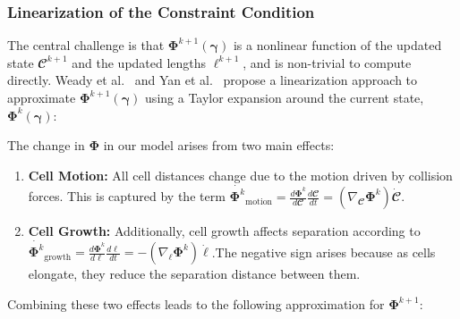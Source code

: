 \documentclass[a4paper,fleqn]{cas-dc}
\begin{document}
\subsubsection{Linearization of the Constraint Condition}

The central challenge is that $\mathbf{\Phi}^{k+1}(\boldsymbol{\gamma})$ is a nonlinear function of the updated state $\mathbfcal{C}^{k+1}$ and the updated lengths $\boldsymbol{\ell}^{k+1}$, and is non-trivial to compute directly. Weady et al.~\cite{Weady2024SM} and Yan et al.~\cite{Yan_2020} propose a linearization approach to approximate $\mathbf{\Phi}^{k+1}(\boldsymbol{\gamma})$ using a Taylor expansion around the current state, $\mathbf{\Phi}^{k}(\boldsymbol{\gamma})$:

\noindent The change in $\mathbf{\Phi}$ in our model arises from two main effects:

\begin{enumerate}
    \item \textbf{Cell Motion:} All cell distances change due to the motion driven by collision forces. This is captured by the term $\dot{\mathbf{\Phi}^k}_{\text{motion}} = \frac{d \mathbf{\Phi}^k}{d \mathbfcal{C}} \frac{d \mathbfcal{C}}{dt} = (\nabla_{\mathbfcal{C}} \mathbf{\Phi}^k) \dot{\mathbfcal{C}}$.
    \item \textbf{Cell Growth:} Additionally, cell growth affects separation according to $\dot{\mathbf{\Phi}^k}_{\text{growth}} = \frac{d \mathbf{\Phi}^k}{d \boldsymbol{\ell}} \frac{d \boldsymbol{\ell}}{dt} =-(\nabla_{\boldsymbol{\ell}} \mathbf{\Phi}^k) \dot{\boldsymbol{\ell}}$.\newline The negative sign arises because as cells elongate, they reduce the separation distance between them.
\end{enumerate}

\noindent Combining these two effects leads to the following approximation for $\mathbf{\Phi}^{k+1}$:
\end{document}
